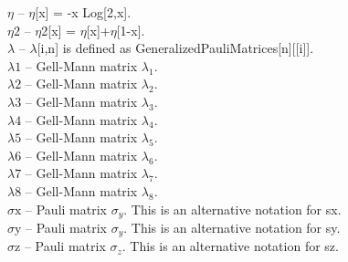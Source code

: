 \documentclass[a4paper,10pt]{scrartcl}
\begin{document}
\textbf{$ \eta  $ }-- $\eta $[x] = -x Log[2,x].$  $\\

\textbf{$ \text{$\eta $2} $ }-- $\eta $2[x] = $\eta $[x]+$\eta $[1-x].$  $\\

\textbf{$ \lambda  $ }-- $\lambda $[i,n] is defined as GeneralizedPauliMatrices[n][[i]].$  $\\

\textbf{$ \text{$\lambda $1} $ }-- Gell-Mann matrix $ \lambda _1. $\\

\textbf{$ \text{$\lambda $2} $ }-- Gell-Mann matrix $ \lambda _2. $\\

\textbf{$ \text{$\lambda $3} $ }-- Gell-Mann matrix $ \lambda _3. $\\

\textbf{$ \text{$\lambda $4} $ }-- Gell-Mann matrix $ \lambda _4. $\\

\textbf{$ \text{$\lambda $5} $ }-- Gell-Mann matrix $ \lambda _5. $\\

\textbf{$ \text{$\lambda $6} $ }-- Gell-Mann matrix $ \lambda _6. $\\

\textbf{$ \text{$\lambda $7} $ }-- Gell-Mann matrix $ \lambda _7. $\\

\textbf{$ \text{$\lambda $8} $ }-- Gell-Mann matrix $ \lambda _8. $\\

\textbf{$ \text{$\sigma $x} $ }-- Pauli matrix $ \sigma _y $. This is an alternative notation for sx.$  $\\

\textbf{$ \text{$\sigma $y} $ }-- Pauli matrix $ \sigma _y $. This is an alternative notation for sy.$  $\\

\textbf{$ \text{$\sigma $z} $ }-- Pauli matrix $ \sigma _z $. This is an alternative notation for sz.$  $\\
\end{document}
